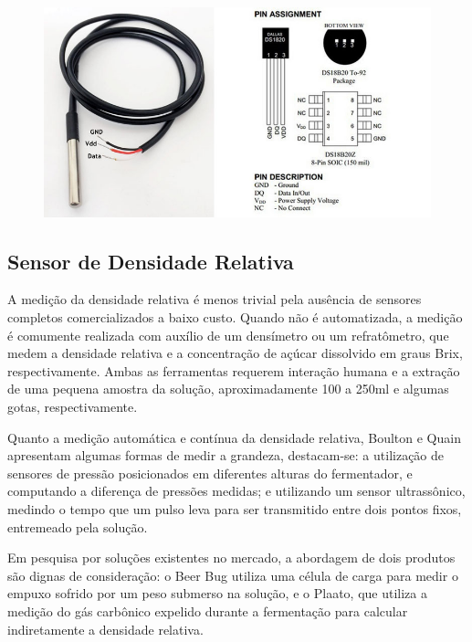\begin{figure}[h]
    \centering
    \includegraphics[scale=0.40]{figuras/projeto/hardware/ds18b20.jpg}
    \label{fig:ds18b20}
\end{figure}

\subsection{Sensor de Densidade Relativa}

A medição da densidade relativa é menos trivial pela ausência de sensores completos comercializados a baixo custo. Quando não é automatizada, a medição é comumente  realizada com auxílio de um densímetro ou um refratômetro, que medem a densidade relativa e a concentração de açúcar dissolvido em graus Brix, respectivamente. Ambas as ferramentas requerem interação humana e a extração de uma pequena amostra da solução, aproximadamente 100 a 250ml e algumas gotas, respectivamente.


Quanto a medição automática e contínua da densidade relativa, Boulton e Quain \cite{BoultonQuain} apresentam algumas formas de medir a grandeza, destacam-se: a utilização de sensores de pressão posicionados em diferentes alturas do fermentador, e computando a diferença de pressões medidas; e utilizando um sensor ultrassônico,  medindo o tempo que um pulso leva para ser transmitido entre dois pontos fixos, entremeado pela solução. 


Em pesquisa por soluções existentes no mercado, a abordagem de dois produtos são dignas de consideração: o Beer Bug utiliza uma célula de carga para medir o empuxo sofrido por um peso submerso na solução, e o Plaato, que utiliza a medição do gás carbônico expelido durante a fermentação para calcular indiretamente a densidade relativa.


